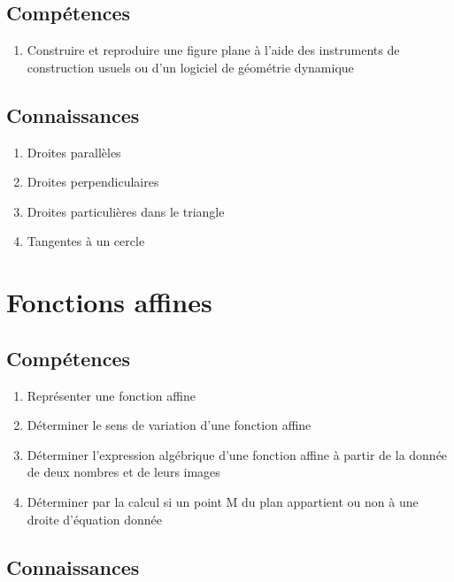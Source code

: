 \documentclass[12pt,a4paper]{article}
\begin{document}
\subsection*{Compétences}
\begin{enumerate}
	\item Construire et reproduire une figure plane à l'aide des instruments de construction usuels ou d'un logiciel de géométrie dynamique
\end{enumerate}

\subsection*{Connaissances}
\begin{enumerate}
	\item Droites parallèles
	\item Droites perpendiculaires
	\item Droites particulières dans le triangle
	\item Tangentes à un cercle
\end{enumerate}


\section{Fonctions affines}
\subsection*{Compétences}
\begin{enumerate}
	\item Représenter une fonction affine
	\item Déterminer le sens de variation d'une fonction affine
	\item Déterminer l'expression algébrique d'une fonction affine à partir de la donnée de deux nombres et de leurs images
	\item Déterminer par la calcul si un point M du plan appartient ou non à une droite d'équation donnée
\end{enumerate}

\subsection*{Connaissances}
\end{document}
